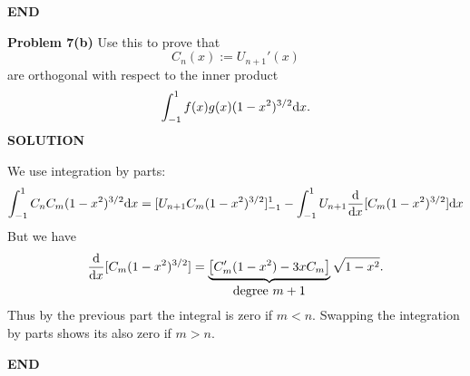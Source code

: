 \documentclass[12pt,a4paper]{article}
\begin{document}
\textbf{END}

\textbf{Problem 7(b)} Use this to prove that
\[
C_n(x) := U_{n+1}'(x)
\]
are orthogonal with respect to the inner product
\[
\ensuremath{\int}_{-1}^1 f(x)g(x) (1-x^2)^{3/2} {\rm d}x.
\]
\textbf{SOLUTION}

We use integration by parts:
\[
\int_{-1}^1 C_n C_m (1-x^2)^{3/2} {\rm d}x = 
[U_{n+1} C_m (1-x^2)^{3/2}]_{-1}^1 -
\int_{-1}^1 U_{n+1} {{\rm d} \over {\rm d} x}[C_m (1-x^2)^{3/2}] {\rm d}x 
\]
But we have
\[
{\D \over \D x}[C_m (1-x^2)^{3/2}] = 
\underbrace{\br[C_m'(1-x^2) - 3x C_m]}_{\hbox{degree $m+1$}} \sqrt{1-x^2}.
\]
Thus by the previous part the integral is zero if $m < n$.  Swapping the integration by parts shows its also zero if $m > n$.

\textbf{END}
\end{document}
